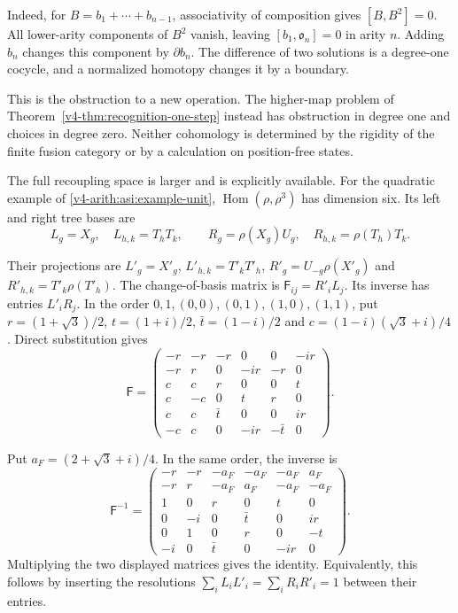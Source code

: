 Indeed, for \(B=b_1+\cdots+b_{n-1}\), associativity of
composition gives \([B,B^2]=0\).
All lower-arity components of \(B^2\) vanish, leaving
\([b_1,\mathfrak o_n]=0\) in arity \(n\).
Adding \(b_n\) changes this component by \(\partial b_n\).
The difference of two solutions is a degree-one cocycle,
and a normalized homotopy changes it by a boundary.

This is the obstruction to a new operation.
The higher-map problem of
Theorem~\ref{v4-thm:recognition-one-step} instead has obstruction
in degree one and choices in degree zero.
Neither cohomology is determined by the rigidity of the finite
fusion category or by a calculation on position-free states.

The full recoupling space is larger and is explicitly available. For the
quadratic example of \eqref{v4-arith:asi:example-unit},
$\operatorname{Hom}(\rho,\rho^3)$ has dimension six. Its left and right
tree bases are
\[
 L_g=X_g,\quad L_{h,k}=T_hT_k,\qquad
 R_g=\rho(X_g)U_g,\quad R_{h,k}=\rho(T_h)T_k.
\]

Their projections are
$L'_g=X'_g$, $L'_{h,k}=T'_kT'_h$,
$R'_g=U_{-g}\rho(X'_g)$ and $R'_{h,k}=T'_k\rho(T'_h)$.
The change-of-basis matrix is $\mathsf F_{ij}=R'_iL_j$. Its inverse has entries
$L'_iR_j$. In the order $0,1,(0,0),(0,1),(1,0),(1,1)$, put
$r=(1+\sqrt3)/2$, $t=(1+i)/2$, $\bar t=(1-i)/2$ and
$c=(1-i)(\sqrt3+i)/4$. Direct substitution gives
\begin{equation}\label{v4-arith:asi:F6}
 \mathsf F=\begin{pmatrix}
 -r&-r&-r&0&0&-ir\\
 -r&r&0&-ir&-r&0\\
 c&c&r&0&0&t\\
 c&-c&0&t&r&0\\
 c&c&\bar t&0&0&ir\\
 -c&c&0&-ir&-\bar t&0
 \end{pmatrix}.
\end{equation}

Put \(a_F=(2+\sqrt3+i)/4\). In the same order, the inverse is
\begin{equation}\label{v4-arith:asi:F6-inverse}
 \mathsf F^{-1}=
 \begin{pmatrix}
 -r&-r&-a_F&-a_F&-a_F&a_F\\
 -r&r&-a_F&a_F&-a_F&-a_F\\
 1&0&r&0&t&0\\
 0&-i&0&\bar t&0&ir\\
 0&1&0&r&0&-t\\
 -i&0&\bar t&0&-ir&0
 \end{pmatrix}.
\end{equation}
Multiplying the two displayed matrices gives the identity.
Equivalently, this follows by inserting the resolutions
\(\sum_iL_iL'_i=\sum_iR_iR'_i=1\) between their entries.

